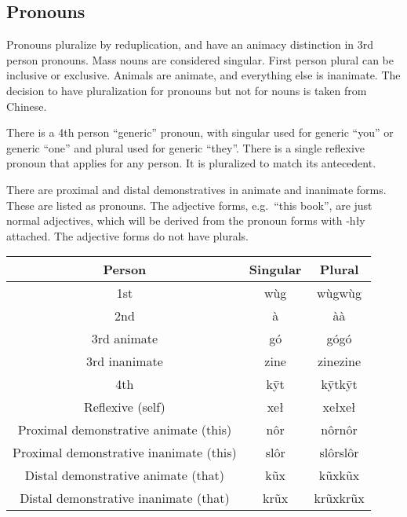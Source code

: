 \subsection{Pronouns}\label{subsec:pronouns}

Pronouns pluralize by reduplication,
and have an animacy distinction in 3rd person pronouns.
Mass nouns are considered singular.
First person plural can be inclusive or exclusive.
Animals are animate, and everything else is inanimate.
The decision to have pluralization for pronouns
but not for nouns is taken from Chinese.

There is a 4th person ``generic'' pronoun,
with singular used for generic ``you'' or generic ``one''
and plural used for generic ``they''.
There is a single reflexive pronoun
that applies for any person.
It is pluralized to match its antecedent.

There are proximal and distal demonstratives
in animate and inanimate forms.
These are listed as pronouns.
The adjective forms, e.g.\ ``this book'', are just normal adjectives,
which will be derived from the pronoun forms with -hły attached.
The adjective forms do not have plurals.

\begin{center}
    \begin{tabular}{|c|c|c|}
        \hline
        Person                                  & Singular & Plural   \\
        \hline
        1st                                     & wùg      & wùgwùg   \\
        \hline
        2nd                                     & à        & àà       \\
        \hline
        3rd animate                             & gó       & gógó     \\
        \hline
        3rd inanimate                           & zine     & zinezine \\
        \hline
        4th                                     & kȳt      & kȳtkȳt   \\
        \hline
        Reflexive (self)                        & xeł      & xełxeł   \\
        \hline
        Proximal demonstrative animate (this)   & nôr      & nôrnôr   \\
        \hline
        Proximal demonstrative inanimate (this) & slôr     & slôrslôr \\
        \hline
        Distal demonstrative animate (that)     & kũx      & kũxkũx   \\
        \hline
        Distal demonstrative inanimate (that)   & krũx     & krũxkrũx \\
        \hline
    \end{tabular}
\end{center}

